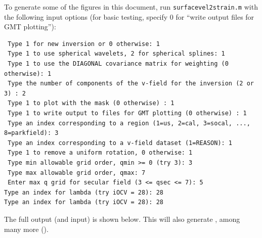 \documentclass[11pt,titlepage,fleqn]{article}
\begin{document}
To generate some of the figures in this document, run \verb+surfacevel2strain.m+ with the following input options (for basic testing, specify 0 for ``write output files for GMT plotting''):
%
\begin{spacing}{1.0}
\begin{verbatim}
 Type 1 for new inversion or 0 otherwise: 1
 Type 1 to use spherical wavelets, 2 for spherical splines: 1
 Type 1 to use the DIAGONAL covariance matrix for weighting (0 otherwise): 1
 Type the number of components of the v-field for the inversion (2 or 3) : 2
 Type 1 to plot with the mask (0 otherwise) : 1
 Type 1 to write output to files for GMT plotting (0 otherwise) : 1
 Type an index corresponding to a region (1=us, 2=cal, 3=socal, ..., 8=parkfield): 3
 Type an index corresponding to a v-field dataset (1=REASON): 1
 Type 1 to remove a uniform rotation, 0 otherwise: 1
 Type min allowable grid order, qmin >= 0 (try 3): 3
 Type max allowable grid order, qmax: 7
 Enter max q grid for secular field (3 <= qsec <= 7): 5
Type an index for lambda (try iOCV = 28): 28
Type an index for lambda (try iOCV = 28): 28
\end{verbatim}
\end{spacing}
%
\noindent
The full output (and input) is shown below. This will also generate , among many more ().
%
\end{document}
